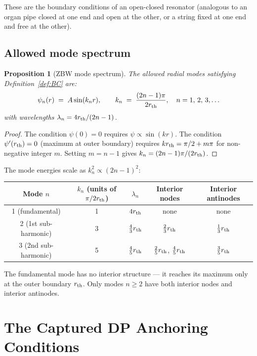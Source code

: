 \documentclass[12pt]{article}
\newtheorem{proposition}[theorem]{Proposition}
\newcommand{\rth}{r_{\rm th}}
\begin{document}
These are the boundary conditions of an open-closed resonator
(analogous to an organ pipe closed at one end and open at the other,
or a string fixed at one end and free at the other).

\subsection{Allowed mode spectrum}

\begin{proposition}[ZBW mode spectrum]
\label{prop:modes}
The allowed radial modes satisfying Definition~\ref{def:BC} are:
\begin{equation}
  \psi_n(r) \;=\; A\sin(k_n r),
  \qquad
  k_n \;=\; \frac{(2n-1)\pi}{2\rth},
  \quad n = 1,\,2,\,3,\ldots
  \label{eq:modes}
\end{equation}
with wavelengths $\lambda_n = 4\rth/(2n-1)$.
\end{proposition}

\begin{proof}
The condition $\psi(0) = 0$ requires $\psi \propto \sin(kr)$.
The condition $\psi'(\rth) = 0$ (maximum at outer boundary) requires
$k\rth = \pi/2 + m\pi$ for non-negative integer $m$.  Setting
$m = n-1$ gives $k_n = (2n-1)\pi/(2\rth)$.
\end{proof}

The mode energies scale as $k_n^2 \propto (2n-1)^2$:
\begin{center}
\renewcommand{\arraystretch}{1.3}
\begin{tabular}{@{}ccccc@{}}
\toprule
Mode $n$ & $k_n$ (units of $\pi/2\rth$) & $\lambda_n$ &
Interior nodes & Interior antinodes \\
\midrule
1 (fundamental)   & 1 & $4\rth$         & none            & none \\
2 (1st sub-harmonic) & 3 & $\tfrac{4}{3}\rth$ & $\tfrac{2}{3}\rth$ & $\tfrac{1}{3}\rth$ \\
3 (2nd sub-harmonic) & 5 & $\tfrac{4}{5}\rth$ & $\tfrac{2}{5}\rth$, $\tfrac{4}{5}\rth$ & $\tfrac{3}{5}\rth$ \\
\bottomrule
\end{tabular}
\end{center}

The fundamental mode has no interior structure --- it reaches its
maximum only at the outer boundary $\rth$.  Only modes $n \geq 2$
have both interior nodes and interior antinodes.

\section{The Captured DP Anchoring Conditions}
\label{sec:anchoring}
\end{document}
